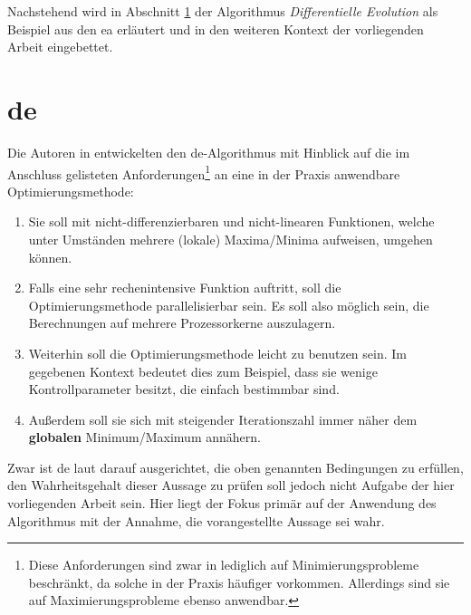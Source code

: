 		Nachstehend wird in Abschnitt \ref{sec:de} der Algorithmus \textit{Differentielle Evolution} als Beispiel aus den \gls{ea} erläutert und in den weiteren Kontext der vorliegenden Arbeit eingebettet.
	

	\section{\gls{de}}
	\label{sec:de}

		Die Autoren in \cite{storn-price-de} entwickelten den \gls{de}-Algorithmus mit Hinblick auf die im Anschluss gelisteten Anforderungen\footnote{Diese Anforderungen sind zwar in \cite{storn-price-de} lediglich auf Minimierungsprobleme beschränkt, da solche in der Praxis häufiger vorkommen. Allerdings sind sie auf Maximierungsprobleme ebenso anwendbar.}
		an eine in der Praxis anwendbare Optimierungsmethode:
		\begin{enumerate}
			\item Sie soll mit nicht-differenzierbaren und nicht-linearen 
			Funktionen, welche unter Umständen mehrere (lokale) Maxima/Minima 
			aufweisen, umgehen können.
			\item Falls eine sehr rechenintensive Funktion auftritt, soll die Optimierungsmethode parallelisierbar sein. Es soll also möglich sein, die Berechnungen auf mehrere Prozessorkerne auszulagern.
			\item Weiterhin soll die Optimierungsmethode leicht zu benutzen sein. Im gegebenen Kontext bedeutet dies zum Beispiel, dass sie wenige Kontrollparameter besitzt, die einfach bestimmbar sind.
			\item Außerdem soll sie sich mit steigender Iterationszahl immer 
			näher dem \textbf{globalen} Minimum/Maximum annähern.
		\end{enumerate}
		Zwar ist \gls{de} laut \cite{storn-price-de} darauf ausgerichtet, die oben genannten Bedingungen zu erfüllen, den Wahrheitsgehalt dieser Aussage zu prüfen soll jedoch nicht Aufgabe der hier vorliegenden Arbeit sein. Hier liegt der Fokus primär auf der Anwendung des Algorithmus mit der Annahme, die vorangestellte Aussage sei wahr. 
		
